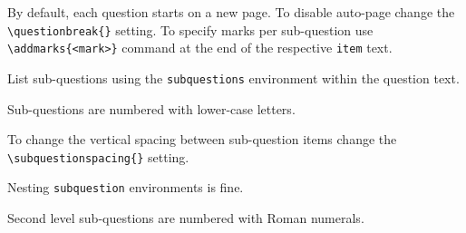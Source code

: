 \documentclass[answers]{otagoexam}
\begin{document}
\begin{question}
    
    By default, each question starts on a new page.  To disable auto-page change the\\ \texttt{\textbackslash questionbreak\{\}} setting.  To specify marks per sub-question use\\ \verb$\addmarks{<mark>}$ command at the end of the respective \texttt{item} text.
    

    \begin{subquestions}
        \item List sub-questions using the \texttt{subquestions} environment within the question text. 
        \item Sub-questions are numbered with lower-case letters. 

        \item To change the vertical spacing between sub-question items change the\\ \texttt{\textbackslash subquestionspacing\{\}} setting. 
        \item{
            \begin{subquestions}
                \item Nesting \texttt{subquestion} environments is fine. 
                \item Second level sub-questions are numbered with Roman numerals. 
            \end{subquestions}
        }
        
    \end{subquestions}

\end{question}
\end{document}
